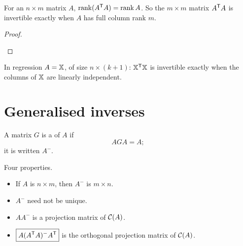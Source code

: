 \begin{corollary}
For an $n\times m$ matrix $A$, $\operatorname{rank}(A^{\mathsf{T}} A)=\operatorname{rank} A$. So the $m\times m$ matrix $A^{\mathsf{T}} A$ is invertible exactly when $A$ has full column rank $m$.
\end{corollary}
\begin{proof}
\begin{deriv}
\end{deriv}
\end{proof}

In regression $A=\mathbb{X}$, of size $n\times(k+1)$: $\mathbb{X}^{\mathsf{T}}\mathbb{X}$ is invertible exactly when the columns of $\mathbb{X}$ are linearly independent.

\section{Generalised inverses}

\begin{definition}
A matrix $G$ is a  of $A$ if
\[
  \boxed{\;AGA=A;\;}
\]
it is written $A^-$.
\end{definition}

\begin{result}[Properties of $A^-$]
Four properties.
\begin{itemize}
  \item[(1)] If $A$ is $n\times m$, then $A^-$ is $m\times n$.
  \item[(2)] $A^-$ need not be unique.
  \item[(3)] $AA^-$ is a projection matrix of $\mathcal{C}(A)$.
  \item[(4)] $\boxed{A(A^{\mathsf{T}} A)^-A^{\mathsf{T}}}$ is the orthogonal projection matrix of $\mathcal{C}(A)$.
\end{itemize}
\end{result}


